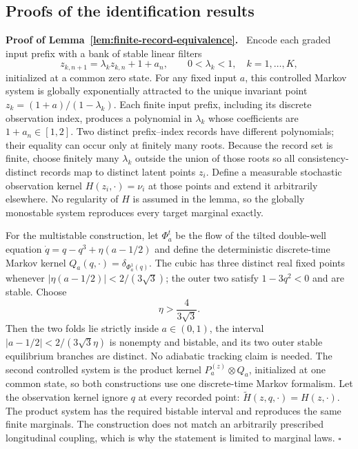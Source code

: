 \documentclass[10pt,a4paper]{article}
\newcommand{\inlinehead}[1]{\par\smallskip\noindent\textbf{#1}\ }
\begin{document}
\begin{appendices}
\renewcommand{\theHequation}{\Alph{section}.\arabic{equation}}
\renewcommand{\theHtable}{\Alph{section}.\arabic{table}}
\renewcommand{\theHfigure}{\Alph{section}.\arabic{figure}}

\section{Proofs of the identification results}

\inlinehead{Proof of Lemma~\ref{lem:finite-record-equivalence}.} Encode each graded input prefix with a bank of stable linear filters
\begin{equation}
z_{k,n+1}=\lambda_k z_{k,n}+1+a_n,
\qquad 0<\lambda_k<1,\quad k=1,\ldots,K,
\end{equation}
initialized at a common zero state. For any fixed input $a$, this controlled Markov system is globally exponentially attracted to the unique invariant point $z_k=(1+a)/(1-\lambda_k)$. Each finite input prefix, including its discrete observation index, produces a polynomial in $\lambda_k$ whose coefficients are $1+a_n\in[1,2]$. Two distinct prefix--index records have different polynomials; their equality can occur only at finitely many roots. Because the record set is finite, choose finitely many $\lambda_k$ outside the union of those roots so all consistency-distinct records map to distinct latent points $z_i$. Define a measurable stochastic observation kernel $H(z_i,\cdot)=\nu_i$ at those points and extend it arbitrarily elsewhere. No regularity of $H$ is assumed in the lemma, so the globally monostable system reproduces every target marginal exactly.

For the multistable construction, let $\Phi_a^t$ be the flow of the tilted double-well equation $\dot q=q-q^3+\eta(a-1/2)$ and define the deterministic discrete-time Markov kernel $Q_a(q,\cdot)=\delta_{\Phi_a^1(q)}$. The cubic has three distinct real fixed points whenever $|\eta(a-1/2)|<2/(3\sqrt3)$; the outer two satisfy $1-3q^2<0$ and are stable. Choose
\begin{equation}
\eta>\frac{4}{3\sqrt3}.
\end{equation}
Then the two folds lie strictly inside $a\in(0,1)$, the interval $|a-1/2|<2/(3\sqrt3\eta)$ is nonempty and bistable, and its two outer stable equilibrium branches are distinct. No adiabatic tracking claim is needed. The second controlled system is the product kernel $P_a^{(z)}\otimes Q_a$, initialized at one common state, so both constructions use one discrete-time Markov formalism. Let the observation kernel ignore $q$ at every recorded point: $\widetilde H(z,q,\cdot)=H(z,\cdot)$. The product system has the required bistable interval and reproduces the same finite marginals. The construction does not match an arbitrarily prescribed longitudinal coupling, which is why the statement is limited to marginal laws. \hfill$\square$


\end{appendices}
\end{document}
